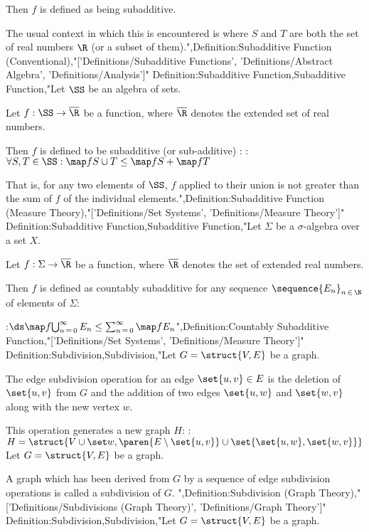 Then $f$ is defined as being subadditive.


The usual context in which this is encountered is where $S$ and $T$ are both the set of real numbers $\R$ (or a subset of them).",Definition:Subadditive Function (Conventional),"['Definitions/Subadditive Functions', 'Definitions/Abstract Algebra', 'Definitions/Analysis']"
Definition:Subadditive Function,Subadditive Function,"Let $\SS$ be an algebra of sets.

Let $f: \SS \to \overline \R$ be a function, where $\overline \R$ denotes the extended set of real numbers.


Then $f$ is defined to be subadditive (or sub-additive) :
:$\forall S, T \in \SS: \map f {S \cup T} \le \map f S + \map f T$


That is, for any two elements of $\SS$, $f$ applied to their union is not greater than the sum of $f$ of the individual elements.",Definition:Subadditive Function (Measure Theory),"['Definitions/Set Systems', 'Definitions/Measure Theory']"
Definition:Subadditive Function,Subadditive Function,"Let $\Sigma$ be a $\sigma$-algebra over a set $X$.

Let $f: \Sigma \to \overline \R$ be a function, where $\overline \R$ denotes the set of extended real numbers.


Then $f$ is defined as countably subadditive  for any sequence $\sequence {E_n}_{n \mathop \in \N}$ of elements of $\Sigma$:

:$\ds \map f {\bigcup_{n \mathop = 0}^\infty E_n} \le \sum_{n \mathop = 0}^\infty \map f {E_n}$",Definition:Countably Subadditive Function,"['Definitions/Set Systems', 'Definitions/Measure Theory']"
Definition:Subdivision,Subdivision,"Let $G = \struct {V, E}$ be a graph.


The edge subdivision operation for an edge $\set {u, v} \in E$ is the deletion of $\set {u, v}$ from $G$ and the addition of two edges $\set {u, w}$ and $\set {w, v}$ along with the new vertex $w$. 


This operation generates a new graph $H$:
:$H = \struct {V \cup \set w, \paren {E \setminus \set {u, v} } \cup \set {\set {u, w}, \set {w, v} } }$
Let $G = \struct {V, E}$ be a graph.


A graph which has been derived from $G$ by a sequence of edge subdivision operations is called a subdivision of $G$.
",Definition:Subdivision (Graph Theory),"['Definitions/Subdivisions (Graph Theory)', 'Definitions/Graph Theory']"
Definition:Subdivision,Subdivision,"Let $G = \struct {V, E}$ be a graph.


